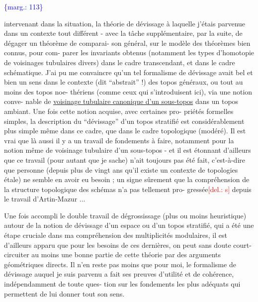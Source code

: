 \documentclass[11pt]{article}
\newcommand{\scanpage}[1]{\par\bigskip\noindent{\small\sffamily[scan #1]}\par}
\newcommand{\mspage}[1]{{\small\sffamily[p.\,#1]}}
\newcommand{\margin}[1]{\textcolor{blue}{\{\textsf{marg.:} #1\}}}
\newcommand{\deleted}[1]{\textcolor{red}{[\textsf{del.:} #1]}}
\newcommand{\uline}[1]{\underline{#1}}
\begin{document}
\margin{113}

\clearpage
\scanpage{119/114}
\mspage{36}

intervenant dans la situation, la théorie de dévissage à laquelle
j'étais parvenue dans un contexte tout différent - avec la tâche
supplémentaire, par la suite, de dégager un théorème de comparai-%
son général, sur le modèle des théorèmes bien connus, pour com-%
parer les invariants obtenus (notamment les types d'homotopie de
voisinages tubulaires divers) dans le cadre transcendant, et dans
le cadre schématique. J'ai pu me convaincre qu'un tel formalisme
de dévissage avait bel et bien un sens dans le contexte (dit
``abstrait'' !) des topos généraux, ou tout au moins des topos noe-%
thériens (comme ceux qui s'introduisent ici), via une notion conve-%
nable de \uline{voisinage tubulaire canonique d'un sous-topos} dans un
topos ambiant. Une fois cette notion acquise, avec certaines pro-%
priétés formelles simples, la description du ``dévissage'' d'un
topos stratifié est considérablement plus simple même dans ce
cadre, que dans le cadre topologique (modéré). Il est vrai que
là aussi il y a un travail de fondements à faire, notamment pour
la notion même de voisinage tubulaire d'un sous-topos - et il est
étonnant d'ailleurs que ce travail (pour autant que je sache)
n'ait toujours pas été fait, c'est-à-dire que personne (depuis plus
de vingt ans qu'il existe un contexte de topologies étale) ne
semble en avoir eu besoin ; un signe sûrement que la compréhension
de la structure topologique des schémas n'a pas tellement pro-%
gressée\deleted{s} depuis le travail d'Artin-Mazur ...

Une fois accompli le double travail de dégrossissage
(plus ou moins heuristique) autour de la notion de dévissage d'un
espace ou d'un topos stratifié, qui a été une étape cruciale dans
ma compréhension des multiplicités modulaires, il est d'ailleurs
apparu que pour les besoins de ces dernières, on peut sans doute
court-circuiter au moins une bonne partie de cette théorie par des
arguments géométriques directs. Il n'en reste pas moins que pour
moi, le formalisme de dévissage auquel je suis parvenu a fait ses
preuves d'utilité et de cohérence, indépendamment de toute ques-%
tion sur les fondements les plus adéquats qui permettent de lui
donner tout son sens.
\end{document}
